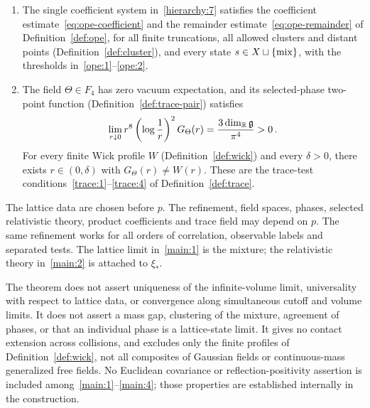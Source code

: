 \begin{theorem}
\begin{enumerate}[label=\textup{P\arabic*.},ref=P\arabic*]
\begin{equation*}
S^\mix(a;x)=\int_X S^\xi(a;x)\,\nu(d\xi)\qquad(x\in\Conf n)\,.
\end{equation*}
The continuation $\mathsf F_n$ is holomorphic in ordered complex times, equals $S^{\xi_*}$ at ordered imaginary times, and has the selected vacuum expectations as its product-test boundary values.
These assertions have exactly the domains and quantifiers in~\ref{recon:1}--\ref{recon:15} of Definition~\ref{def:reconstructed}.
\item\label{main:3} The single coefficient system in~\ref{hierarchy:7} satisfies the coefficient estimate~\eqref{eq:ope-coefficient} and the remainder estimate~\eqref{eq:ope-remainder} of Definition~\ref{def:ope}, for all finite truncations, all allowed clusters and distant points (Definition~\ref{def:cluster}), and every state $s\in X\sqcup\{\mathrm{mix}\}$, with the thresholds in~\ref{ope:1}--\ref{ope:2}.
\item\label{main:4} The field $\Theta\in F_4$ has zero vacuum expectation, and its selected-phase two-point function (Definition~\ref{def:trace-pair}) satisfies
\begin{equation*}
\lim_{r\downarrow0}r^8\left(\log\frac{1}{r}\right)^2G_\Theta(r)
=\frac{3\dim_\mathbb R\mathfrak g}{\pi^4}>0\,.
\end{equation*}
For every finite Wick profile $W$ (Definition~\ref{def:wick}) and every $\delta>0$, there exists $r\in(0,\delta)$ with $G_\Theta(r)\ne W(r)$.
These are the trace-test conditions~\ref{trace:1}--\ref{trace:4} of Definition~\ref{def:trace}.
\end{enumerate}
\end{theorem}

The lattice data are chosen before $p$.
The refinement, field spaces, phases, selected relativistic theory, product coefficients and trace field may depend on $p$.
The same refinement works for all orders of correlation, observable labels and separated tests.
The lattice limit in~\ref{main:1} is the mixture; the relativistic theory in~\ref{main:2} is attached to $\xi_*$.

The theorem does not assert uniqueness of the infinite-volume limit, universality with respect to lattice data, or convergence along simultaneous cutoff and volume limits.
It does not assert a mass gap, clustering of the mixture, agreement of phases, or that an individual phase is a lattice-state limit.
It gives no contact extension across collisions, and excludes only the finite profiles of Definition~\ref{def:wick}, not all composites of Gaussian fields or continuous-mass generalized free fields.
No Euclidean covariance or reflection-positivity assertion is included among~\ref{main:1}--\ref{main:4}; those properties are established internally in the construction.
